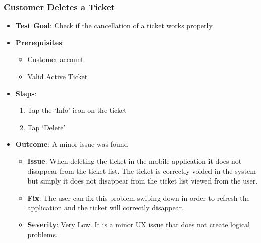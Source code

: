 \subsubsection{Customer Deletes a Ticket}
\begin{itemize}
\item \textbf{Test Goal}: Check if the cancellation of a ticket works properly
\item \textbf{Prerequisites}: 
\begin{itemize}
    \item Customer account
    \item Valid Active Ticket
\end{itemize}
\item \textbf{Steps}:
    \begin{enumerate}
        \item Tap the `Info' icon on the ticket
        \item Tap `Delete'
    \end{enumerate}
\item \textbf{Outcome}: A minor issue was found
    \begin{itemize}
        \item \textbf{Issue}: When deleting the ticket in the mobile application it does not disappear from the ticket list. The ticket is correctly voided in the 
        system but simply it does not disappear from the ticket list viewed from the user. 
        \item \textbf{Fix}: The user can fix this problem swiping down in order to refresh the application and the ticket will correctly disappear.
        \item \textbf{Severity}: Very Low. It is a minor UX issue that does not create logical problems. 
    \end{itemize}
\end{itemize}
